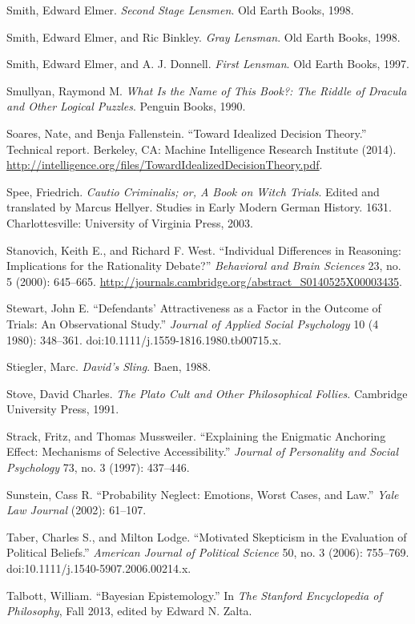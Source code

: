 \documentclass[letterpaper]{book}
\begin{document}
{
 Smith, Edward Elmer. \textit{Second Stage Lensmen}. Old Earth
Books, 1998.}

{
 Smith, Edward Elmer, and Ric Binkley. \textit{Gray Lensman}. Old
Earth Books, 1998.}

{
 Smith, Edward Elmer, and A. J. Donnell. \textit{First Lensman}.
Old Earth Books, 1997.}

{
 Smullyan, Raymond M. \textit{What Is the Name of This Book?: The
Riddle of Dracula and Other Logical Puzzles}. Penguin Books, 1990.}

{
 Soares, Nate, and Benja Fallenstein. ``Toward
Idealized Decision Theory.'' Technical report.
Berkeley, CA: Machine Intelligence Research Institute (2014).
\url{http://intelligence.org/files/TowardIdealizedDecisionTheory.pdf}.}

{
 Spee, Friedrich. \textit{Cautio Criminalis; or, A Book on Witch
Trials}. Edited and translated by Marcus Hellyer. Studies in Early
Modern German History. 1631. Charlottesville: University of Virginia
Press, 2003.}

{
 Stanovich, Keith E., and Richard F. West.
``Individual Differences in Reasoning: Implications
for the Rationality Debate?'' \textit{Behavioral and
Brain Sciences} 23, no. 5 (2000): 645--665.
\url{http://journals.cambridge.org/abstract\_S0140525X00003435}.}

{
 Stewart, John E. ``Defendants'
Attractiveness as a Factor in the Outcome of Trials: An Observational
Study.'' \textit{Journal of Applied Social
Psychology} 10 (4 1980): 348--361.
doi:10.1111/j.1559-1816.1980.tb00715.x.}

{
 Stiegler, Marc. \textit{David's Sling}. Baen,
1988.}

{
 Stove, David Charles. \textit{The Plato Cult and Other
Philosophical Follies}. Cambridge University Press, 1991.}

{
 Strack, Fritz, and Thomas Mussweiler.
``Explaining the Enigmatic Anchoring Effect:
Mechanisms of Selective Accessibility.''
\textit{Journal of Personality and Social Psychology} 73, no. 3 (1997):
437--446.}

{
 Sunstein, Cass R. ``Probability Neglect:
Emotions, Worst Cases, and Law.'' \textit{Yale Law
Journal} (2002): 61--107.}

{
 Taber, Charles S., and Milton Lodge. ``Motivated
Skepticism in the Evaluation of Political Beliefs.''
\textit{American Journal of Political Science} 50, no. 3 (2006):
755--769. doi:10.1111/j.1540-5907.2006.00214.x.}

{
 Talbott, William. ``Bayesian
Epistemology.'' In \textit{The Stanford Encyclopedia
of Philosophy}, Fall 2013, edited by Edward N. Zalta.}
\end{document}
